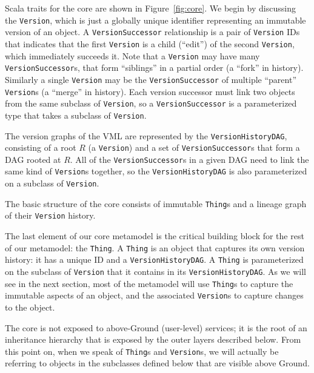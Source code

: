 \documentclass{article}
\newenvironment{tldr}[1][r]
  {\wrapfigure{#1}{0.33\textwidth}\tcolorbox}
  {\endtcolorbox\endwrapfigure}
\newcommand{\vml}{VML\xspace}
\newcommand{\core}{core\xspace}
\newcommand{\version}{\texttt{Version}\xspace}
\newcommand{\thing}{\texttt{Thing}\xspace}
\newcommand{\tag}{\texttt{Tag}\xspace}
\newcommand{\lineagegraph}{lineage graph\xspace}
\newcommand{\versiongraphs}{version graphs\xspace}
\newcommand{\jmh}[1]{{\textcolor{red}{#1---jmh}}}
\begin{document}
Scala traits for the \core are shown in Figure~\ref{fig:core}.  We begin by discussing the \version, which is just a globally unique identifier representing an immutable version of an object.
A \texttt{VersionSuccessor} relationship is a pair of \version IDs that indicates that the
first \version is a child (``edit'') of the second \version, which immediately succeeds it.
Note that a \version may have many \texttt{VersionSuccessor}s, that form ``siblings'' in a partial order (a ``fork'' in history).  Similarly a single \version may be the \texttt{VersionSuccessor} of multiple ``parent'' {\version}s (a ``merge'' in history). Each version successor must link two objects from the same
subclass of \version, so a \texttt{VersionSuccessor} is a parameterized type that takes a subclass of
\version.

The \versiongraphs of the \vml are represented by the \texttt{VersionHistoryDAG}, consisting of a root $R$ (a \version) and a set of
\texttt{VersionSuccessor}s that form a DAG rooted at $R$.
All of the \texttt{VersionSuccessor}s in a given DAG need to link the same kind of 
{\version}s together, so the \texttt{VersionHistoryDAG} is also parameterized on a subclass of \version.

\begin{tldr}
The basic structure of the \core consists of immutable {\thing}s and a \lineagegraph of their \version history.  
\end{tldr}

The last element of our \core metamodel is the critical building block for
the rest of our metamodel: the \thing. A
\thing is an object that captures its own version history: it has a
unique ID and a \texttt{VersionHistoryDAG}. A \thing is parameterized on the subclass of
\version that it contains in its \texttt{VersionHistoryDAG}.  As we will see in the next section, most of the metamodel will use {\thing}s to capture the immutable aspects of an object, and the associated {\version}s to capture changes 
to the object.


The \core is not exposed to above-Ground (user-level) services; it is the root of an inheritance hierarchy that is exposed by the outer layers described below.  From this point on, when we speak of {\thing}s and {\version}s, we will actually be referring to objects in the subclasses defined below that are visible above Ground.
\end{document}
